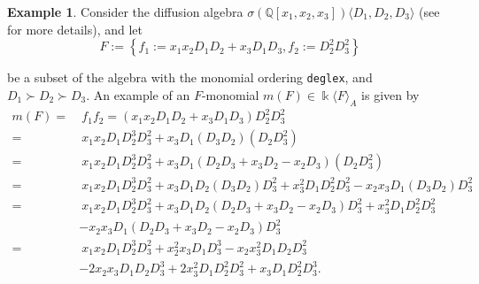 \documentclass{amsart}
\theoremstyle{definition}
\newtheorem{example}[theorem]{Example}
\theoremstyle{remark}
\numberwithin{equation}{section}
\begin{document}
\begin{example}\label{mondiffusion}
Consider the diffusion algebra  $\sigma(\mathbb{Q}[x_1,x_2, x_3])\langle D_1, D_2, D_3\rangle$ (see \cite[Section 2.4]{Fajardoetal2020} for more details), and let 
$$
F :=\left\{f_1 :=x_1x_2D_1D_2+x_3D_1D_3, f_2:=D_2^2D_3^2\right\}
$$ 

be a subset of the algebra with the monomial ordering \texttt{deglex}, and $D_1\succ D_2\succ D_3$. An example of an $F$-monomial $m(F) \in \Bbbk\langle F\rangle_A$ is given by
	\begin{align*}
	m(F) = &\ f_1f_2 = \left(x_1x_2D_1D_2+x_3D_1D_3\right)D_2^2D_3^2\\ = &\ x_1x_2D_1D_2^3D_3^2+x_3D_1\left(D_3D_2\right) \left(D_2D_3^2\right)\\ = &\ x_1x_2D_1D_2^3D_3^2+x_3D_1 \left(D_2D_3+x_3D_2-x_2D_3\right) \left(D_2D_3^2\right)\\ = &\ x_1x_2D_1D_2^3D_3^2+x_3D_1D_2\left(D_3D_2\right)D_3^2+x_3^2D_1D_2^2D_3^2-x_2x_3D_1\left(D_3D_2\right)D_3^2\\ = &\ 	x_1x_2D_1D_2^3D_3^2+x_3D_1D_2\left(D_2D_3+x_3D_2-x_2D_3\right) D_3^2+x_3^2D_1D_2^2D_3^2\\&-x_2x_3D_1\left(D_2D_3+x_3D_2-x_2D_3\right)D_3^2\\ = &\ 	x_1x_2D_1D_2^3D_3^2+x_2^2x_3D_1D_3^3-x_2x_3^2D_1D_2D_3^2\\ & -2x_2x_3D_1D_2D_3^3+2x_3^2D_1D_2^2D_3^2+x_3D_1D_2^2D_3^3.
	\end{align*}
\end{example}
\end{document}

